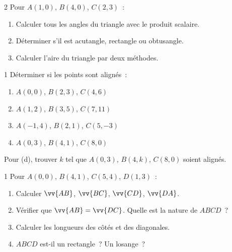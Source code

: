 \begin{exo}{2}
Pour $A(1,0)$, $B(4,0)$, $C(2,3)$~:
\begin{enumerate}
  \item Calculer tous les angles du triangle avec le produit scalaire.
  \item D\'eterminer s'il est acutangle, rectangle ou obtusangle.
  \item Calculer l'aire du triangle par deux m\'ethodes.
\end{enumerate}
\end{exo}

\begin{exo}{1}
D\'eterminer si les points sont align\'es~:
\begin{enumerate}
  \item $A(0,0)$, $B(2,3)$, $C(4,6)$
  \item $A(1,2)$, $B(3,5)$, $C(7,11)$
  \item $A(-1,4)$, $B(2,1)$, $C(5,-3)$
  \item $A(0,3)$, $B(4,1)$, $C(8,0)$
\end{enumerate}
Pour (d), trouver $k$ tel que $A(0,3)$, $B(4,k)$, $C(8,0)$ soient align\'es.
\end{exo}

\begin{exo}{1}
Pour $A(0,0)$, $B(4,1)$, $C(5,4)$, $D(1,3)$~:
\begin{enumerate}
  \item Calculer $\vv{AB}$, $\vv{BC}$, $\vv{CD}$, $\vv{DA}$.
  \item V\'erifier que $\vv{AB}=\vv{DC}$. Quelle est la nature de $ABCD$~?
  \item Calculer les longueurs des c\^ot\'es et des diagonales.
  \item $ABCD$ est-il un rectangle~? Un losange~?
\end{enumerate}
\end{exo}

